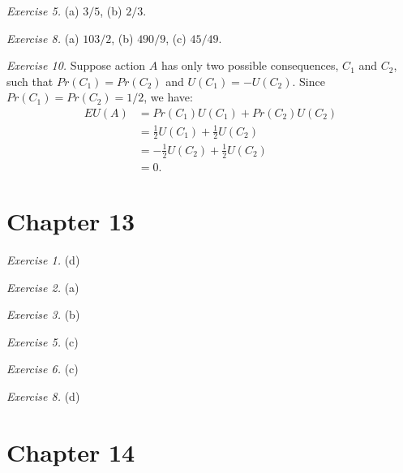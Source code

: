 \documentclass[justified]{tufte-book}
\newcommand{\p}{Pr}
\begin{document}
\vspace{.5em}

\noindent
\emph{Exercise 5.} (a) \(3/5\), (b) \(2/3\).

\vspace{.5em}

\noindent
\emph{Exercise 8.} (a) \(103/2\), (b) \(490/9\), (c) \(45/49\).

\vspace{.5em}

\noindent
\emph{Exercise 10.} Suppose action \(A\) has only two possible consequences, \(C_1\) and \(C_2\), such that \(\p(C_1) = \p(C_2)\) and \(U(C_1) = -U(C_2)\). Since \(\p(C_1) = \p(C_2) = 1/2\), we have:
\[
    \begin{aligned}
      EU(A) 
        &= \p(C_1) U(C_1) + \p(C_2) U(C_2) \\
        &= \frac{1}{2} U(C_1) + \frac{1}{2} U(C_2) \\
        &= -\frac{1}{2} U(C_2) + \frac{1}{2} U(C_2) \\
        &= 0.
    \end{aligned}
  \]

\hypertarget{chapter-13}{%
\section*{Chapter 13}\label{chapter-13}}

\noindent
\emph{Exercise 1.} (d)

\vspace{.5em}

\noindent
\emph{Exercise 2.} (a)

\vspace{.5em}

\noindent
\emph{Exercise 3.} (b)

\vspace{.5em}

\noindent
\emph{Exercise 5.} (c)

\vspace{.5em}

\noindent
\emph{Exercise 6.} (c)

\vspace{.5em}

\noindent
\emph{Exercise 8.} (d)

\hypertarget{chapter-14}{%
\section*{Chapter 14}\label{chapter-14}}
\end{document}
